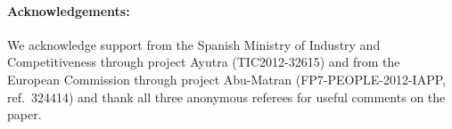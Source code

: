 \documentclass[11pt]{article}
\newcommand{\todomlf}[1]{\renewcommand{\baselinestretch}{0.55}\todo{\scriptsize\sf MLF: #1}\renewcommand{\baselinestretch}{1.0}}
\begin{document}
\paragraph{Acknowledgements:} We acknowledge support from the Spanish Ministry of Industry and Competitiveness through project Ayutra (TIC2012-32615) and from the European Commission through project Abu-Matran (FP7-PEOPLE-2012-IAPP, ref.\ 324414) and thank all three anonymous referees for useful comments on the paper.%



\small{

}
\end{document}
